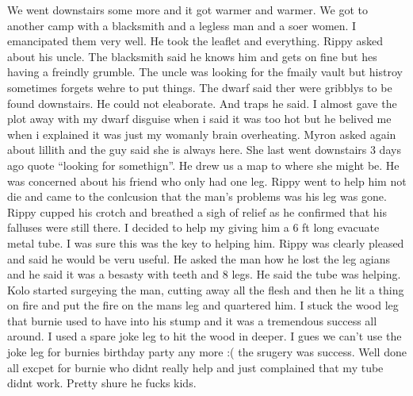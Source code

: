 We went downstairs some more and it got warmer and warmer. We got to another camp with a blacksmith and a legless man and a soer women. I emancipated them very well. He took the leaflet and everything. Rippy asked about his uncle. The blacksmith said he knows him and gets on fine but hes having a freindly grumble. The uncle was looking for the fmaily vault but histroy sometimes forgets wehre to put things. The dwarf said ther were gribblys to be found downstairs. He could not eleaborate. And traps he said. I almost gave the plot away with my dwarf disguise when i said it was too hot but he belived me when i explained it was just my womanly brain overheating. Myron asked again about lillith and the guy said she is always here. She last went downstairs 3 days ago quote “looking for somethign”. He drew us a map to where she might be. He was concerned about his friend who only had one leg. Rippy went to help him not die and came to the conlcusion that the man’s problems was his leg was gone. Rippy cupped his crotch and breathed a sigh of relief as he confirmed that his falluses were still there. I decided to help my giving him a 6 ft long evacuate metal tube. I was sure this was the key to helping him. Rippy was clearly pleased and said he would be veru useful. He asked the man how he lost the leg agians and he said it was a besasty with teeth and 8 legs. He said the tube was helping. Kolo started surgeying the man, cutting away all the flesh and then he lit a thing on fire and put the fire on the mans leg and quartered him. I stuck the wood leg that burnie used to have into his stump and it was a tremendous success all around. I used a spare joke leg to hit the wood in deeper. I gues we can’t use the joke leg for burnies birthday party any more :( the srugery was success. Well done all excpet for burnie who didnt really help and just complained that my tube didnt work. Pretty shure he fucks kids.\medskip

